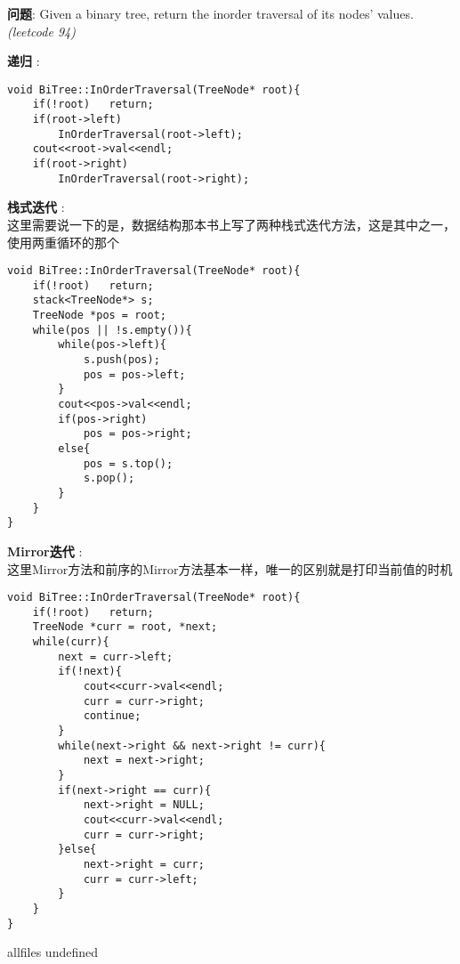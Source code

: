 \documentclass{article}
\begin{document}
\begin{CJK}{UTF8}{gbsn}     %

\else
	
\begin{description}
	\item{\textbf{问题}}: Given a binary tree, return the inorder traversal of its nodes' values. \textit{(leetcode 94)}
	\item{\textbf{递归}} : 
	\\
	\begin{lstlisting}
void BiTree::InOrderTraversal(TreeNode* root){
	if(!root)	return;
	if(root->left)
		InOrderTraversal(root->left);
	cout<<root->val<<endl;
	if(root->right)
		InOrderTraversal(root->right);
	\end{lstlisting}
	\item{\textbf{栈式迭代}} : 
	\\这里需要说一下的是，数据结构那本书上写了两种栈式迭代方法，这是其中之一，使用两重循环的那个
	\begin{lstlisting}
void BiTree::InOrderTraversal(TreeNode* root){
	if(!root)	return;
	stack<TreeNode*> s;
	TreeNode *pos = root;
	while(pos || !s.empty()){
		while(pos->left){
			s.push(pos);
			pos = pos->left;
		}
		cout<<pos->val<<endl;
		if(pos->right)
			pos = pos->right;
		else{
			pos = s.top();
			s.pop();
		}
	}
}
	\end{lstlisting}
	\item{\textbf{Mirror迭代}} : 
	\\这里Mirror方法和前序的Mirror方法基本一样，唯一的区别就是打印当前值的时机
	\begin{lstlisting}
void BiTree::InOrderTraversal(TreeNode* root){
	if(!root)	return;
	TreeNode *curr = root, *next;
	while(curr){
		next = curr->left;
		if(!next){
			cout<<curr->val<<endl;
			curr = curr->right;
			continue;
		}
		while(next->right && next->right != curr){
			next = next->right;
		}
		if(next->right == curr){
			next->right = NULL;
			cout<<curr->val<<endl;
			curr = curr->right;
		}else{
			next->right = curr;
			curr = curr->left;
		}
	}
}
	\end{lstlisting}
\end{description}

\fi

\ifx allfiles undefined
\end{CJK}
\end{document}
